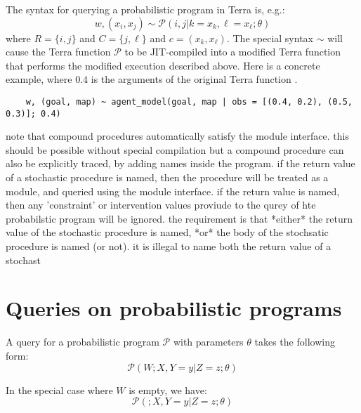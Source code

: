 \documentclass{article}
\begin{document}
The syntax for querying a probabilistic program in Terra is, e.g.:
\begin{equation}
    w, (x_i, x_j) \sim \mathcal{P}(i, j | k = x_k, \ell = x_{\ell}; \theta)
\end{equation}
where $R = \{i, j\}$ and $C = \{j, \ell\}$ and $c = (x_k, x_{\ell})$.
The special syntax $\sim$ will cause the Terra function $\mathcal{P}$ to be JIT-compiled into a modified Terra function that performs the modified execution described above.
Here is a concrete example, where $0.4$ is the arguments of the original Terra function .
\begin{lstlisting}
    w, (goal, map) ~ agent_model(goal, map | obs = [(0.4, 0.2), (0.5, 0.3)]; 0.4)
\end{lstlisting}


note that compound procedures automatically satisfy the module interface.
this should be possible without special compilation
but a compound procedure can also be explicitly traced, by adding names inside the program.
if the return value of a stochastic procedure is named, then the procedure will be treated as a module, and queried using the module interface.
if the return value is named, then any 'constraint' or intervention values proviude to the qurey of hte probabilstic program will be ignored.
the requirement is that *either* the return value of the stochastic procedure is named, *or* the body of the stochsatic procedure is named (or not).
it is illegal to name both the return value of a stochast


\clearpage


\section{Queries on probabilistic programs}

A query for a probabilistic program $\mathcal{P}$ with parameters $\theta$ takes the following form:
\begin{equation}
    \mathcal{P}(W ; X, Y=y| Z=z; \theta)
\end{equation}

In the special case where $W$ is empty, we have:
\begin{equation}
    \mathcal{P}(; X, Y=y| Z=z; \theta)
\end{equation}



\end{document}
